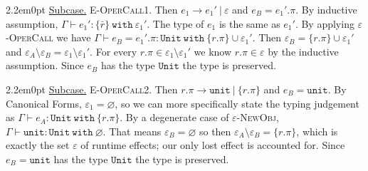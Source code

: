 \documentclass{llncs}
\newcommand{\keywadj}[1]{\mathtt{#1}}
\newcommand{\keyw}[1]{\keywadj{#1}~}
\newcommand{\subcase}[1] {
	\begin{adjustwidth}{2.2em}{0pt}
		\underline{Subcase.} #1
	\end{adjustwidth}
}
\newcommand{\type}[2]{
	#1~\keyw{with} #2
}
\begin{document}
{{	\subcase { \textsc{E-OperCall1}. Then $e_1 \longrightarrow e_1'~|~\varepsilon$ and $e_B = e_1'.\pi$. By inductive assumption, $\Gamma \vdash e_1' : \{ \bar r \} ~ \keyw{with} \varepsilon_1'$. The type of $e_1$ is the same as $e_1'$. By applying \textsc{$\varepsilon$-OperCall} we have $\Gamma \vdash e_B = e_1'.\pi : \type{ \keywadj{Unit} }{\{r.\pi\} \cup \varepsilon_1'}$. Then $\varepsilon_B = \{ r.\pi \} \cup \varepsilon_1'$ and $\varepsilon_A \setminus \varepsilon_B = \varepsilon_1 \setminus \varepsilon_1'$. For every $r.\pi \in \varepsilon_1 \setminus \varepsilon_1'$ we know $r.\pi \in \varepsilon$ by the inductive assumption. Since $e_B$ has the type $\keywadj{Unit}$ the type is preserved.
	}
	
	\subcase{ \textsc{E-OperCall2}. Then $r.\pi \longrightarrow \keywadj{unit}~|~\{ r.\pi \}$ and $e_B = \keywadj{unit}$. By Canonical Forms, $\varepsilon_1 = \varnothing$, so we can more specifically state the typing judgement as $\Gamma \vdash e_A : \keyw{Unit~with} \{ r.\pi \}$. By a degenerate case of \textsc{$\varepsilon$-NewObj}, $\Gamma \vdash \keywadj{unit} : \keyw{Unit~with} \varnothing$. That means $\varepsilon_B = \varnothing$ so then $\varepsilon_A \setminus \varepsilon_B = \{ r.\pi \}$, which is exactly the set $\varepsilon$ of runtime effects; our only lost effect is accounted for. Since $e_B = \keywadj{unit}$ has the type $\keywadj{Unit}$ the type is preserved.}	
}
}
\end{document}
